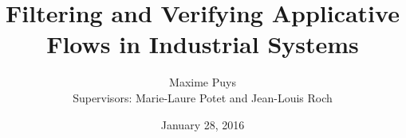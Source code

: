 \documentclass{beamer}
\title{Filtering and Verifying Applicative Flows in Industrial Systems}
\author[Maxime Puys]{Maxime Puys\\[.5cm]Supervisors: Marie-Laure Potet and Jean-Louis Roch}
\institute{VERIMAG, Univ. Grenoble Alpes}
\date{January 28, 2016}
\begin{document}
\begin{frame}
    \maketitle

    \begin{columns}
        \begin{column}{.2\textwidth}
        \end{column}
        \begin{column}{.2\textwidth}
        \end{column}
        \begin{column}{.15\textwidth}
        \end{column}
    \end{columns}
\end{frame}
\end{document}
